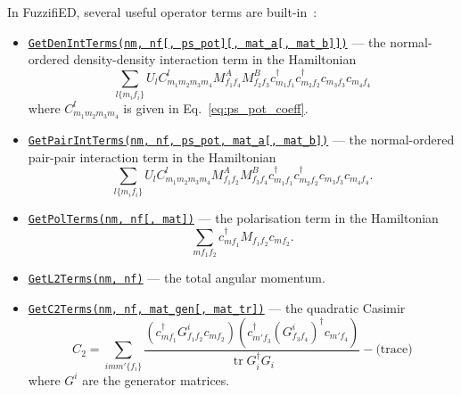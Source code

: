 \documentclass{timesjhep}
\begin{document}
In FuzzifiED, several useful operator terms are built-in~:
\begin{itemize}
    \item \href{https://docs.fuzzified.world/models/\#FuzzifiED.GetDenIntTerms}{\lstinline|GetDenIntTerms(nm, nf[, ps_pot][, mat_a[, mat_b]])|} --- the normal-ordered den\-sity-density interaction term in the Hamiltonian
    \begin{equation}
        \sum_{l\{m_if_i\}}U_lC^l_{m_1m_2m_3m_4}M^A_{f_1f_4}M^B_{f_2f_3}c^\dagger_{m_1f_1}c^\dagger_{m_2f_2}c_{m_3f_3}c_{m_4f_4}
    \end{equation}
    where $C^l_{m_1m_2m_3m_4}$ is given in Eq.~\eqref{eq:ps_pot_coeff}.
    \item \href{https://docs.fuzzified.world/models/\#FuzzifiED.GetPairIntTerms}{\lstinline|GetPairIntTerms(nm, nf, ps_pot, mat_a[, mat_b])|} --- the normal-ordered pair-pair interaction term in the Hamiltonian
    \begin{equation}
        \sum_{l\{m_if_i\}}U_lC^l_{m_1m_2m_3m_4}M^A_{f_1f_2}M^B_{f_3f_4}c^\dagger_{m_1f_1}c^\dagger_{m_2f_2}c_{m_3f_3}c_{m_4f_4}.
    \end{equation}
    \item \href{https://docs.fuzzified.world/models/\#FuzzifiED.GetPolTerms-Tuple{Int64,\%20Int64,\%20Matrix{\%3C:Number}}}{\lstinline|GetPolTerms(nm, nf[, mat])|} --- the polarisation term in the Hamiltonian
    \begin{equation}
        \sum_{mf_1f_2}c^\dagger_{mf_1}M_{f_1f_2}c_{mf_2}.
    \end{equation}
    \item \href{https://docs.fuzzified.world/models/\#FuzzifiED.GetL2Terms-Tuple{Int64,\%20Int64}}{\lstinline|GetL2Terms(nm, nf)|} --- the total angular momentum.
    \item \href{https://docs.fuzzified.world/models/\#FuzzifiED.GetC2Terms-Tuple{Int64,\%20Int64,\%20Vector{\%3C:AbstractMatrix{\%3C:Number}}}}{\lstinline|GetC2Terms(nm, nf, mat_gen[, mat_tr])|} --- the quadratic Casimir
    \begin{equation}
        C_2=\sum_{imm'\{f_i\}}\frac{(c^\dagger_{mf_1}G^i_{f_1f_2}c_{mf_2})(c^\dagger_{m'f_3}(G^i_{f_3f_4})^\dagger c_{m'f_4})}{\operatorname{tr}G_i^\dagger G_i}-\textrm{(trace)}
    \end{equation}
    where $G^i$ are the generator matrices.
\end{itemize}
\end{document}
